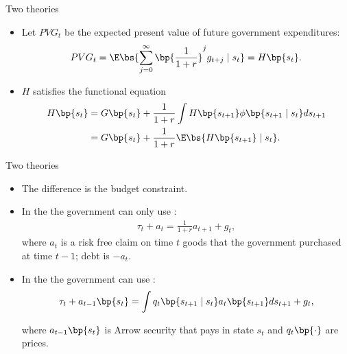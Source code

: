 \documentclass[11pt,xcolor={dvipsnames},hyperref={pdftex,pdfpagemode=UseNone,hidelinks,pdfdisplaydoctitle=true},usepdftitle=false]{beamer}
\begin{document}
    \begin{frame}{Two theories}
        \begin{itemize}
            \item Let $PVG_t$ be the expected present value of future government expenditures: 
            \begin{align*}
                PVG_t = \E \bs{\sum_{j=0}^\infty \bp{\frac{1}{1+r}}^j g_{t+j}\mid s_t } = H\bp{s_t}.
            \end{align*}

            \item $H$ satisfies the functional equation
            \begin{align*}
                H\bp{s_t} & = G\bp{s_t} + \frac{1}{1+r} \int H\bp{s_{t+1}}  \phi\bp{s_{t+1}\mid s_t } ds_{t+1} \\
                & = G\bp{s_t} + \frac{1}{1+r} \E \bs{H\bp{s_{t+1}} \mid s_t }.
            \end{align*}
        \end{itemize}
    \end{frame}
    
    
    \begin{frame}{Two theories}
    \begin{itemize}
    \item The  difference is the budget constraint.
    \item In the  the government can only use : 
    \begin{align*}
     \tau_t + a_t = \frac{1}{1+r} a_{t+1} + g_t, 
    \end{align*}     where $a_t$ is a risk free claim on time $t$ goods that the
    government purchased at time $t-1$; debt is $-a_t$.
    \item In the  the government can use :
    \begin{align*}
        \tau_t + a_{t-1}\bp{s_t} = \int q_t\bp{s_{t+1} \mid s_t } a_{t}\bp{s_{t+1}} ds_{t+1} + g_t, 
       \end{align*} 
   
    where $a_{t-1}\bp{s_t}$ is Arrow security that pays in state $s_t$ and $q_t\bp{\cdot}$ are prices. 
    \end{itemize}
    \end{frame}
\end{document}
